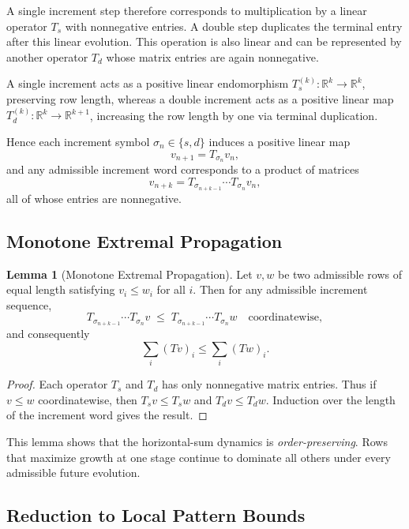 \documentclass[12pt, oneside]{article}   	%
\numberwithin{equation}{section}          %
\theoremstyle{definition}
\newtheorem{lemma}[theorem]{Lemma}
\begin{document}
A single increment step therefore corresponds to multiplication by a linear
operator $T_s$ with nonnegative entries. A double step duplicates the terminal
entry after this linear evolution. This operation is also linear and can be
represented by another operator $T_d$ whose matrix entries are again nonnegative.

A single increment acts as a positive linear endomorphism
$T_s^{(k)} : \mathbb{R}^{k} \to \mathbb{R}^{k}$, preserving row length, whereas
a double increment acts as a positive linear map
$T_d^{(k)} : \mathbb{R}^{k} \to \mathbb{R}^{k+1}$, increasing the row length by one
via terminal duplication.

Hence each increment symbol $\sigma_n\in\{s,d\}$ induces a positive linear map
\[
v_{n+1} = T_{\sigma_n} v_n,
\]
and any admissible increment word corresponds to a product of matrices
\[
v_{n+k} = T_{\sigma_{n+k-1}}\cdots T_{\sigma_n} v_n,
\]
all of whose entries are nonnegative.


\subsection{Monotone Extremal Propagation}

\begin{lemma}[Monotone Extremal Propagation]
\label{lem:monotone-propagation}
Let $v,w$ be two admissible rows of equal length satisfying
$v_i \le w_i$ for all $i$. Then for any admissible increment sequence,
\[
T_{\sigma_{n+k-1}}\cdots T_{\sigma_n} v
\;\le\;
T_{\sigma_{n+k-1}}\cdots T_{\sigma_n} w
\quad \text{coordinatewise},
\]
and consequently
\[
\sum_i (T v)_i \le \sum_i (T w)_i.
\]
\end{lemma}

\begin{proof}
Each operator $T_s$ and $T_d$ has only nonnegative matrix entries. Thus
if $v\le w$ coordinatewise, then $T_s v \le T_s w$ and $T_d v \le T_d w$.
Induction over the length of the increment word gives the result.
\end{proof}

This lemma shows that the horizontal-sum dynamics is \emph{order-preserving}.
Rows that maximize growth at one stage continue to dominate all others
under every admissible future evolution.


\subsection{Reduction to Local Pattern Bounds}
\end{document}
